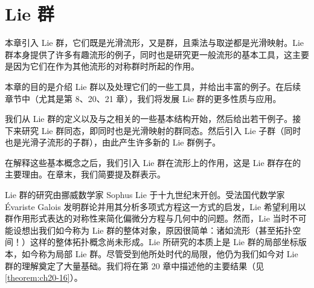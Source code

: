 \documentclass[../main.tex]{subfiles}
\begin{document}
\chapter{Lie 群}\label{chapter:ch07-Lie群}

本章引入 Lie 群，它们既是光滑流形，又是群，且乘法与取逆都是光滑映射。Lie 群本身提供了许多有趣流形的例子，同时也是研究更一般流形的基本工具，这主要是因为它们在作为其他流形的对称群时所起的作用。

本章的目的是介绍 Lie 群以及处理它们的一些工具，并给出丰富的例子。在后续章节中（尤其是第 8、20、21 章），我们将发展 Lie 群的更多性质与应用。

我们从 Lie 群的定义以及与之相关的一些基本结构开始，然后给出若干例子。接下来研究 Lie 群同态，即同时也是光滑映射的群同态。然后引入 Lie 子群（同时也是光滑子流形的子群），由此产生许多新的 Lie 群例子。

在解释这些基本概念之后，我们引入 Lie 群在流形上的作用，这是 Lie 群存在的主要理由。在章末，我们简要提及群表示。

Lie 群的研究由挪威数学家 Sophus Lie 于十九世纪末开创。受法国代数学家 Évariste Galois 发明群论并用其分析多项式方程这一方式的启发，Lie 希望利用以群作用形式表达的对称性来简化偏微分方程与几何中的问题。然而，Lie 当时不可能设想出我们如今称为 Lie 群的整体对象，原因很简单：诸如流形（甚至拓扑空间！）这样的整体拓扑概念尚未形成。Lie 所研究的本质上是 Lie 群的局部坐标版本，如今称为局部 Lie 群。尽管受到他所处时代的局限，他仍为我们如今对 Lie 群的理解奠定了大量基础。我们将在第 20 章中描述他的主要结果（见\cref{theorem:ch20-16}）。






\end{document}

